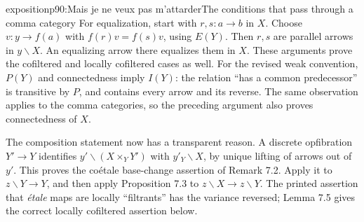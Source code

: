 \begin{dcomment}{exposition}{p90:Mais je ne veux pas m'attarder}{The conditions that pass through a comma category}
For equalization, start with $r,s:a\to b$ in $X$. Choose $v:y\to f(a)$ with $f(r)v=f(s)v$, using $E(Y)$. Then $r,s$ are parallel arrows in $y\backslash X$. An equalizing arrow there equalizes them in $X$. These arguments prove the cofiltered and locally cofiltered cases as well. For the revised weak convention, $P(Y)$ and connectedness imply $I(Y)$: the relation ``has a common predecessor'' is transitive by $P$, and contains every arrow and its reverse. The same observation applies to the comma categories, so the preceding argument also proves connectedness of $X$.

The composition statement now has a transparent reason. A discrete opfibration $Y'\to Y$ identifies $y'\backslash(X\times_Y Y')$ with $y'_{Y}\backslash X$, by unique lifting of arrows out of $y'$. This proves the co\'etale base-change assertion of Remark 7.2. Apply it to $z\backslash Y\to Y$, and then apply Proposition 7.3 to $z\backslash X\to z\backslash Y$. The printed assertion that \emph{\'etale} maps are locally ``filtrants'' has the variance reversed; Lemma 7.5 gives the correct locally cofiltered assertion below.
\end{dcomment}

